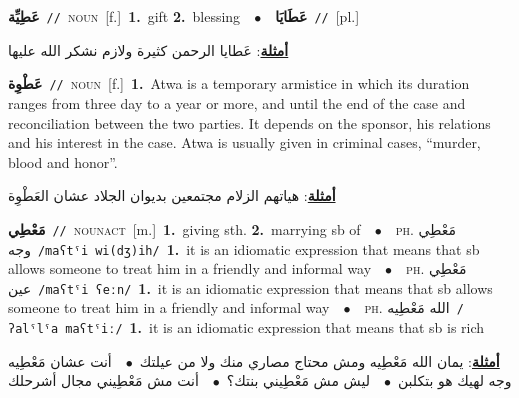 \documentclass[10pt,a4paper,twoside]{article} %
\begin{document}
\begin{multicols}{2}
{\setlength\topsep{0pt}\textbf{\foreignlanguage{arabic}{عَطِيِّة}}\ {\color{gray}\texttt{//}\color{black}}\ \textsc{noun}\ [f.]\ \textbf{1.}~gift  \textbf{2.}~blessing\ \ $\bullet$\ \ \setlength\topsep{0pt}\textbf{\foreignlanguage{arabic}{عَطَايَا}}\ {\color{gray}\texttt{//}\color{black}}\ [pl.]\  \begin{flushright}\color{gray}\foreignlanguage{arabic}{\textbf{\underline{\foreignlanguage{arabic}{أمثلة}}}: عَطايا الرحمن كثيرة ولازم نشكر الله عليها}\end{flushright}\color{black}} \vspace{2mm}

{\setlength\topsep{0pt}\textbf{\foreignlanguage{arabic}{عَطْوِة}}\ {\color{gray}\texttt{//}\color{black}}\ \textsc{noun}\ [f.]\ \textbf{1.}~Atwa is a temporary armistice in which its duration ranges from three day to a year or more, and until the end of the case and reconciliation between the two parties. It depends on the sponsor, his relations and his interest in the case. Atwa is usually given in criminal cases, “murder, blood and honor”.\  \begin{flushright}\color{gray}\foreignlanguage{arabic}{\textbf{\underline{\foreignlanguage{arabic}{أمثلة}}}: هياتهم الزلام مجتمعين بديوان الجلاد عشان العَطْوِة}\end{flushright}\color{black}} \vspace{2mm}

{\setlength\topsep{0pt}\textbf{\foreignlanguage{arabic}{مَعْطِي}}\ {\color{gray}\texttt{//}\color{black}}\ \textsc{noun\textunderscore act}\ [m.]\ \textbf{1.}~giving sth.  \textbf{2.}~marrying sb of\ \ $\bullet$\ \ \textsc{ph.} \color{gray} \foreignlanguage{arabic}{مَعْطِي وجه}\color{black}\ {\color{gray}\texttt{/{\sffamily maʕtˤi wi(dʒ)ih}/}\color{black}}\ \textbf{1.}~it is an idiomatic expression that means that sb allows someone to treat him in a friendly and informal way\ \ $\bullet$\ \ \textsc{ph.} \color{gray} \foreignlanguage{arabic}{مَعْطِي عين}\color{black}\ {\color{gray}\texttt{/{\sffamily maʕtˤi ʕeːn}/}\color{black}}\ \textbf{1.}~it is an idiomatic expression that means that sb allows someone to treat him in a friendly and informal way\ \ $\bullet$\ \ \textsc{ph.} \color{gray} \foreignlanguage{arabic}{الله مَعْطِيه}\color{black}\ {\color{gray}\texttt{/{\sffamily ʔalˤlˤa maʕtˤiː}/}\color{black}}\ \textbf{1.}~it is an idiomatic expression that means that sb is rich\  \begin{flushright}\color{gray}\foreignlanguage{arabic}{\textbf{\underline{\foreignlanguage{arabic}{أمثلة}}}: يمان الله مَعْطِيه ومش محتاج مصاري منك ولا من عيلتك\ $\bullet$\ \  أنت عشان مَعْطِيه وجه لهيك هو بتكلبن\ $\bullet$\ \  ليش مش مَعْطِيني بنتك؟\ $\bullet$\ \  أنت مش مَعْطِيني مجال أشرحلك}\end{flushright}\color{black}} \vspace{2mm}


\end{multicols}
\end{document}
